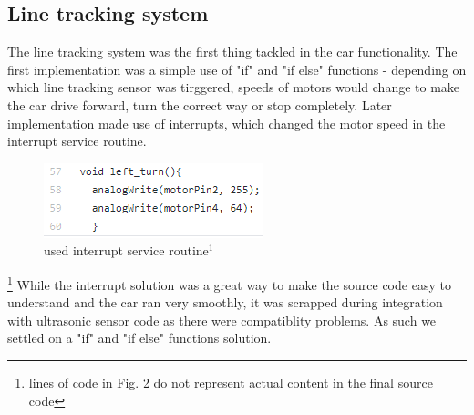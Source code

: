 \documentclass[conference]{IEEEtran}
\begin{document}
\subsection{Line tracking system}
The line tracking system was the first thing tackled in the car functionality. The first implementation was a simple use of "if" and "if else" functions - depending on which line tracking sensor was tirggered, speeds of motors would change to make the car drive forward, turn the correct way or stop completely. Later implementation made use of interrupts, which changed the motor speed in the interrupt service routine.
\begin{figure}[h!]
	\includegraphics[width=\linewidth]{examplecode1.png}
	\caption{used interrupt service routine$^{1}$}
	\label{fig:EXC1}
\end{figure}
\footnote{lines of code in Fig. 2 do not represent actual content in the final source code}
While the interrupt solution was a great way to make the source code easy to understand and the car ran very smoothly, it was scrapped during integration with ultrasonic sensor code as there were compatiblity problems. As such we settled on a "if" and "if else" functions solution.
\end{document}

